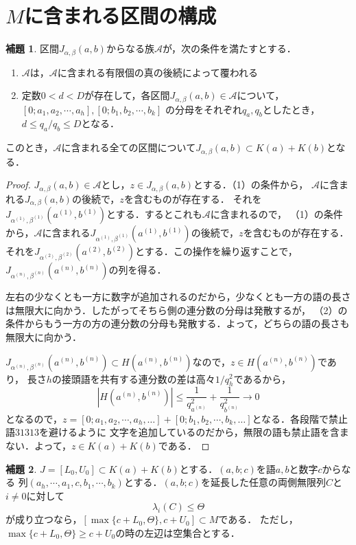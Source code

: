 \documentclass[10pt,a4paper]{ujarticle}
\theoremstyle{definition}
\newtheorem{lemma}{補題}
\begin{document}
\section{$M$に含まれる区間の構成}
\begin{lemma}
\label{lem1}
    区間$J_{\alpha, \beta}(a, b)$からなる族$\mathcal{A}$が，次の条件を満たすとする．
    \begin{enumerate}
        \item $\mathcal{A}$は，$\mathcal{A}$に含まれる有限個の真の後続によって覆われる
        \item 定数$0 < d < D$が存在して，各区間$J_{\alpha, \beta}(a, b) \in \mathcal{A}$について，$[0; a_1, a_2, \cdots, a_h], [0; b_1, b_2, \cdots, b_k]$
        の分母をそれぞれ$q_a, q_b$としたとき，$d \le q_a / q_b \le D$となる．
    \end{enumerate}
    このとき，$\mathcal{A}$に含まれる全ての区間について$J_{\alpha, \beta}(a, b) \subset K(a) + K(b)$となる．
\end{lemma}
\begin{proof}
$J_{\alpha, \beta}(a, b) \in \mathcal{A}$とし，$z\in J_{\alpha, \beta}(a, b)$とする．（1）の条件から，
$\mathcal{A}$に含まれる$J_{\alpha, \beta}(a, b)$の後続で，$z$を含むものが存在する．
それを$J_{\alpha^{(1)}, \beta^{(1)}}(a^{(1)}, b^{(1)})$とする．するとこれも$\mathcal{A}$に含まれるので，
（1）の条件から，$\mathcal{A}$に含まれる$J_{\alpha^{(1)}, \beta^{(1)}}(a^{(1)}, b^{(1)})$の後続で，$z$を含むものが存在する．
それを$J_{\alpha^{(2)}, \beta^{(2)}}(a^{(2)}, b^{(2)})$とする．この操作を繰り返すことで，
$J_{\alpha^{(n)}, \beta^{(n)}}(a^{(n)}, b^{(n)})$の列を得る．

左右の少なくとも一方に数字が追加されるのだから，少なくとも一方の語の長さは無限大に向かう．したがってそちら側の連分数の分母は発散するが，
（2）の条件からもう一方の方の連分数の分母も発散する．よって，どちらの語の長さも無限大に向かう．

$J_{\alpha^{(n)}, \beta^{(n)}}(a^{(n)}, b^{(n)})\subset H(a^{(n)}, b^{(n)})$なので，$z\in H(a^{(n)}, b^{(n)})$であり，
長さ$h$の接頭語を共有する連分数の差は高々$1/q_h^2$であるから，
\[
\left| H(a^{(n)}, b^{(n)}) \right| \le \frac{1}{q_{a^{(n)}}^2} + \frac{1}{q_{b^{(n)}}^2}\to 0
\]
となるので，$z = [0; a_1, a_2, \cdots, a_h,\dots] + [0; b_1, b_2, \cdots, b_k,\dots]$となる．各段階で禁止語$31313$を避けるように
文字を追加しているのだから，無限の語も禁止語を含まない．よって，$z\in K(a) + K(b)$である．
\end{proof}
\begin{lemma}
\label{lem2}
    $J = [L_0, U_0] \subset K(a) + K(b)$とする．$(a, b; c)$を語$a, b$と数字$c$からなる
    列$(a_h,\cdots, a_1, c, b_1,\cdots, b_k)$とする．$(a, b; c)$を延長した任意の両側無限列$C$と$i\neq 0$に対して
    \[
    \lambda_i(C) \le \Theta
    \]
    が成り立つなら，$[\max\{c + L_0, \Theta\}, c + U_0]\subset M$である．
    ただし，$\max\{c + L_0, \Theta\} \ge c + U_0$の時の左辺は空集合とする．
\end{lemma}
\end{document}
